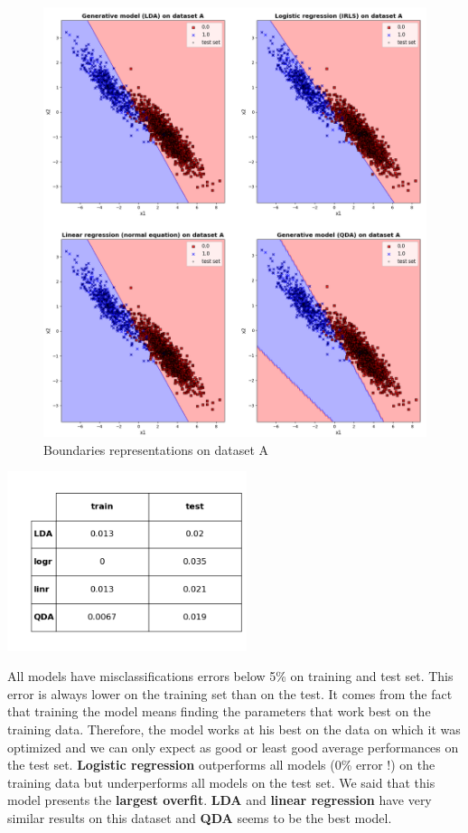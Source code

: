 \documentclass[a4paper, 11pt]{article}
\begin{document}
\begin{figure}[!h]
\centering
\includegraphics[width=16cm]{dataset_A_crop.png}
\caption{Boundaries representations on dataset A}
\end{figure}

\noindent\begin{minipage}[b]{0.5\linewidth}
\centering
\includegraphics[width=7cm]{dataset_A_table.png}
\end{minipage}%
\hfill
\begin{minipage}[b]{0.5\linewidth}
All models have misclassifications errors below 5\% on training and test set. This error is always lower on the training
set than on the test. It comes from the fact that training the model means finding the parameters that work best on the 
training data. Therefore, the model works at his best on the data on which it was optimized and we can only expect as good 
or least good average performances on the test set. \textbf{Logistic regression} outperforms all models (0\% error !) on 
the training data but underperforms all models on the test set. We said that this model presents the \textbf{largest overfit}.
\textbf{LDA} and \textbf{linear regression} have very similar results on this dataset and \textbf{QDA} seems to be the
best model.
\end{minipage}
\end{document}
